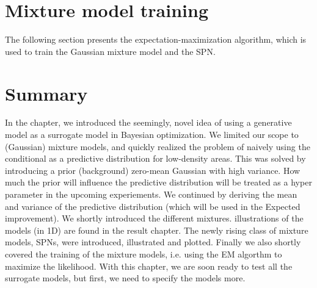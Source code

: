 




\newpage
\section{Mixture model training}
The following section presents the expectation-maximization algorithm, which is used to 
train the Gaussian mixture model and the SPN. 



\section{Summary}
In the chapter, we introduced the seemingly, novel idea of using a generative model as a surrogate
model in Bayesian optimization. We limited our scope to (Gaussian) mixture models, and quickly
realized the problem of naively using the conditional as a predictive distribution for low-density
areas. This was solved by introducing a prior (background) zero-mean Gaussian with high variance.
How much the prior will influence the predictive distribution will be treated as a hyper parameter
in the upcoming experiements. We continued by deriving the mean and variance of the predictive
distribution (which will be used in the Expected improvement). We shortly introduced the different
mixtures. illustrations of the models (in 1D) are found in the result chapter. The newly rising
class of mixture models, SPNs, were introduced, illustrated and plotted. Finally we also shortly
covered the training of the mixture models, i.e. using the EM algorthm to maximize the likelihood.
With this chapter, we are soon ready to test all the surrogate models, but first,
we need to specify the models more.  